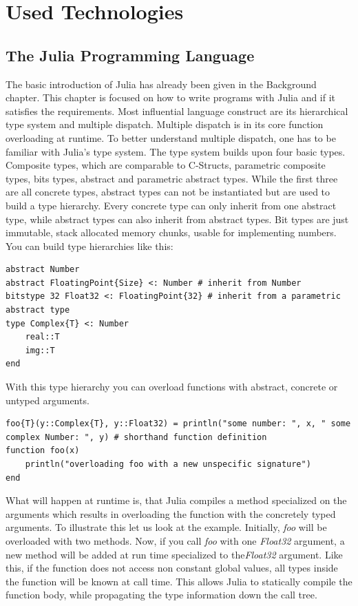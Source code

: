\section{Used Technologies}

\subsection{The Julia Programming Language}

The basic introduction of Julia has already been given in the Background chapter.
This chapter is focused on how to write programs with Julia and if it satisfies the requirements.
Most influential language construct are its hierarchical type system and multiple dispatch.
Multiple dispatch is in its core function overloading at runtime. 
To better understand multiple dispatch, one has to be familiar with Julia's type system.
The type system builds upon four basic types. 
Composite types, which are comparable to C-Structs, parametric composite types, bits types, abstract and parametric abstract types.
While the first three are all concrete types, abstract types can not be instantiated but are used to build a type hierarchy.
Every concrete type can only inherit from one abstract type, while abstract types can also inherit from abstract types.
Bit types are just immutable, stack allocated memory chunks, usable for implementing numbers.
You can build type hierarchies like this:
\begin{lstlisting}
abstract Number
abstract FloatingPoint{Size} <: Number # inherit from Number
bitstype 32 Float32 <: FloatingPoint{32} # inherit from a parametric abstract type
type Complex{T} <: Number
    real::T
    img::T
end
\end{lstlisting}

With this type hierarchy you can overload functions with abstract, concrete or untyped arguments.

\begin{lstlisting}
foo{T}(y::Complex{T}, y::Float32) = println("some number: ", x, " some complex Number: ", y) # shorthand function definition
function foo(x)
    println("overloading foo with a new unspecific signature")
end
\end{lstlisting}

What will happen at runtime is, that Julia compiles a method specialized on the arguments which results in overloading the function with the concretely typed arguments.
To illustrate this let us look at the example. 
Initially, \textit{foo} will be overloaded with two methods.
Now, if you call \textit{foo} with one \textit{Float32} argument, a new method will be added at run time specialized to the\textit{Float32} argument.
Like this, if the function does not access non constant global values, all types inside the function will be known at call time.
This allows Julia to statically compile the function body, while propagating the type information down the call tree.


